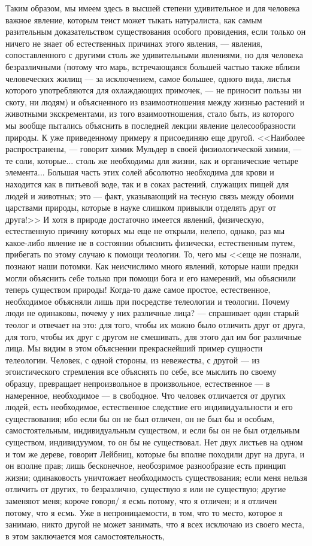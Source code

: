 \documentclass[12pt]{article}
\begin{document}
Таким образом, мы имеем здесь в высшей степени удивительное и для человека важное явление, которым теист может тыкать натуралиста, как самым разительным доказательством существования особого провидения, если только он ничего не знает об естественных причинах этого явления, --- явления, сопоставленного с другими столь же удивительными явлениями, но для человека безразличными (потому что марь, встречающаяся большей частью также вблизи человеческих жилищ --- за исключением, самое большее, одного вида, листья которого употребляются для охлаждающих примочек, --- не приносит пользы ни скоту, ни людям) и объясненного из взаимоотношения между жизнью растений и животными экскрементами, из того взаимоотношения, стало быть, из которого мы вообще пытались объяснить в последней лекции явление целесообразности природы. К уже приведенному примеру я присоединяю еще другой. <<Наиболее распространены, --- говорит химик Мульдер в своей физиологической химии, --- те соли, которые... столь же необходимы для жизни, как и органические четыре элемента... Большая часть этих солей абсолютно необходима для крови и находится как в питьевой воде, так и в соках растений, служащих пищей для людей и животных; это --- факт, указывающий на тесную связь между обоими царствами природы, которые в науке слишком привыкли отделять друг от друга!>> И хотя в природе достаточно имеется явлений, физическую, естественную причину которых мы еще не открыли, нелепо, однако, раз мы какое-либо явление не в состоянии объяснить физически, естественным путем, прибегать по этому случаю к помощи теологии. То, чего мы <<еще не познали, познают наши потомки. Как неисчислимо много явлений, которые наши предки могли объяснить себе только при помощи бога и его намерений, мы объяснили теперь существом природы! Когда-то даже самое простое, естественное, необходимое объясняли лишь при посредстве телеологии и теологии. Почему люди не одинаковы, почему у них различные лица? --- спрашивает один старый теолог и отвечает на это: для того, чтобы их можно было отличить друг от друга, для того, чтобы их друг с другом не смешивать, для этого дал им бог различные лица. Мы видим в этом объяснении прекраснейший пример сущности телеологии. Человек, с одной стороны, из невежества, с другой --- из эгоистического стремления все объяснять по себе, все мыслить по своему образцу, превращает непроизвольное в произвольное, естественное --- в намеренное, необходимое --- в свободное. Что человек отличается от других людей, есть необходимое, естественное следствие его индивидуальности и его существования; ибо если бы он не был отличен, он не был бы и особым, самостоятельным, индивидуальным существом, и если бы он не был отдельным существом, индивидуумом, то он бы не существовал. Нет двух листьев на одном и том же дереве, говорит Лейбниц, которые бы вполне походили друг на друга, и он вполне прав; лишь бесконечное, необозримое разнообразие есть принцип жизни; одинаковость уничтожает необходимость существования; если меня нельзя отличить от других, то безразлично, существую я или не существую; другие заменяют меня; короче говоря/ я есмь потому, что я отличен; и я отличен потому, что я есмь. Уже в непроницаемости, в том, что то место, которое я занимаю, никто другой не может занимать, что я всех исключаю из своего места, в этом заключается моя самостоятельность, 
\end{document}
